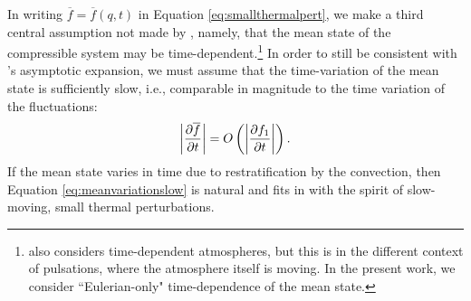 \documentclass[12pt]{article}
\begin{document}

	In writing $\overline{f}=\overline{f}(q,t)$ in Equation \eqref{eq:smallthermalpert}, we make a third central assumption not made by \citet{Gough1969}, namely, that the mean state of the compressible system may be time-dependent.\footnote{\citet{Gough1969} also considers time-dependent atmospheres, but this is in the different context of pulsations, where the atmosphere itself is moving. In the present work, we consider ``Eulerian-only" time-dependence of the mean state.} In order to still be consistent with \citet{Gough1969}'s asymptotic expansion, we must assume that the time-variation of the mean state is sufficiently slow, i.e., comparable in magnitude to the time variation of the fluctuations:
\begin{align}\label{eq:meanvariationslow}
	\left|\frac{\partial\overline{f}}{\partial t}\right| = O\left(\left|\frac{\partial f_1}{\partial t}\right|\right).
\end{align}
If the mean state varies in time due to restratification by the convection, then Equation \eqref{eq:meanvariationslow} is natural and fits in with the spirit of slow-moving, small thermal perturbations. 
\end{document}
